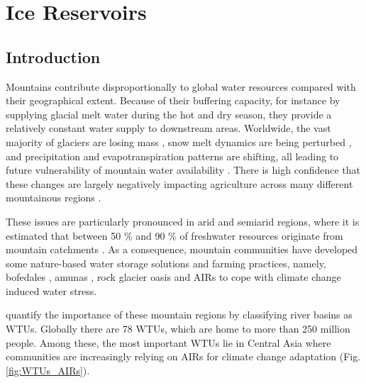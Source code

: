 \chapter{Ice Reservoirs}



\section{Introduction}

Mountains contribute disproportionally to global water resources compared with their geographical extent.
Because of their buffering capacity, for instance by supplying glacial melt water during the hot and dry season,
they provide a relatively constant water supply to downstream areas. Worldwide, the vast majority of glaciers
are losing mass \citep{zempGlobalGlacierMass2019a}, snow melt dynamics are being perturbed
\citep{mukhopadhyayReevaluationSnowmeltGlacial2015, hammondGlobalSnowZone2018}, and precipitation and
evapotranspiration patterns are shifting, all leading to future vulnerability of mountain water availability
\citep{lutzConsistentIncreaseHigh2014}. There is high confidence that these changes are largely negatively
impacting agriculture across many different mountainous regions \citep{ipccCrossChapterPaperMountains2022}.

These issues are particularly pronounced in arid and semiarid regions, where it is estimated that between 50 \%
and 90 \% of freshwater resources originate from mountain catchments
\citep{mukhopadhyayReevaluationSnowmeltGlacial2015, messerliMountainsWorldVulnerable2004}. As a consequence,
mountain communities have developed some nature-based water storage solutions and farming practices, namely,
bofedales \citep{monge-salazarEcohydrologyEcosystemServices2022}, amunas
\citep{ochoa-tocachiPotentialContributionsPreInca2019}, rock glacier oasis \citep{pandeyRockGlacierOasis2022}
and \ac{AIRs} \citep{wangchukIceStupaCompetition2020} to cope with climate change induced water stress.

\citet{immerzeelImportanceVulnerabilityWorld2020} quantify the importance of these mountain regions by
classifying river basins as \ac{WTUs}. Globally there are 78 \ac{WTUs}, which are home to more than 250 million
people. Among these, the most important WTUs lie in Central Asia where communities are increasingly relying on
\ac{AIRs} for climate change adaptation (Fig. \ref{fig:WTUs_AIRs}). 

